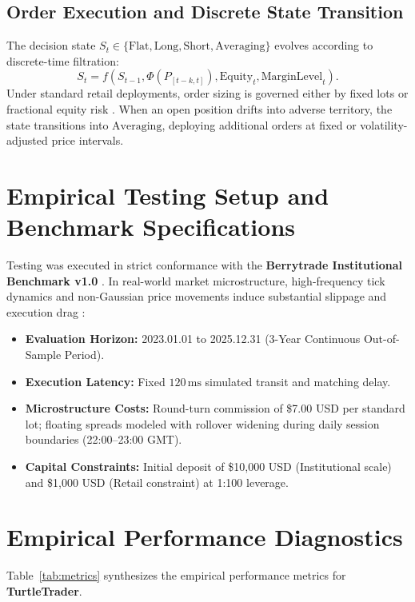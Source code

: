 \documentclass[11pt,a4paper]{article}
\begin{document}
\subsection{Order Execution and Discrete State Transition}
The decision state $S_t \in \{\text{Flat}, \text{Long}, \text{Short}, \text{Averaging}\}$ evolves according to discrete-time filtration:
\begin{equation}
S_{t} = f(S_{t-1}, \Phi(P_{[t-k, t]}), \text{Equity}_t, \text{MarginLevel}_t).
\end{equation}
Under standard retail deployments, order sizing is governed either by fixed lots or fractional equity risk \cite{lopez2018advances, carhart1997persistence}. When an open position drifts into adverse territory, the state transitions into $\text{Averaging}$, deploying additional orders at fixed or volatility-adjusted price intervals.

\section{Empirical Testing Setup and Benchmark Specifications}
Testing was executed in strict conformance with the \textbf{Berrytrade Institutional Benchmark v1.0} \cite{artsu2026illusion}. In real-world market microstructure, high-frequency tick dynamics and non-Gaussian price movements induce substantial slippage and execution drag \cite{kyle1985continuous, amihud2002illiquidity, cont2001empirical, mandelbrot1963variation}:
\begin{itemize}
    \item \textbf{Evaluation Horizon:} 2023.01.01 to 2025.12.31 (3-Year Continuous Out-of-Sample Period).
    \item \textbf{Execution Latency:} Fixed $120\,\text{ms}$ simulated transit and matching delay.
    \item \textbf{Microstructure Costs:} Round-turn commission of \$7.00 USD per standard lot; floating spreads modeled with rollover widening during daily session boundaries (22:00--23:00 GMT).
    \item \textbf{Capital Constraints:} Initial deposit of \$10,000 USD (Institutional scale) and \$1,000 USD (Retail constraint) at 1:100 leverage.
\end{itemize}

\section{Empirical Performance Diagnostics}
Table~\ref{tab:metrics} synthesizes the empirical performance metrics for \textbf{TurtleTrader}.
\end{document}

